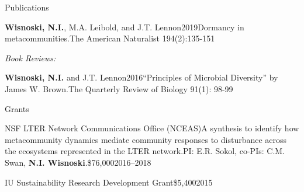 \documentclass{resume} %
\begin{document}
\begin{rhangSection}{Publications}
\begin{Publication}{{\bf Wisnoski, N.I.}, M.A. Leibold, and J.T. Lennon}{2019}{Dormancy in metacommunities.}{The American Naturalist 194(2):135-151}
\end{Publication}

\bigskip

{\it Book Reviews:}
\begin{Publication}{{\bf Wisnoski, N.I.} and J.T. Lennon}{2016}{\enquote{Principles of Microbial Diversity} by James W. Brown.}{The Quarterly Review of Biology 91(1): 98-99}
\end{Publication}

\end{rhangSection}

\bigskip

\newpage
\begin{rSection}{Grants}

\begin{Grant}{NSF LTER Network Communications Office (NCEAS)}{A synthesis to identify how metacommunity dynamics mediate community responses to disturbance across the ecosystems represented in the LTER network.}{PI: E.R. Sokol, co-PIs: C.M. Swan, {\bf N.I. Wisnoski}.}{\$76,000}{2016--2018}
\end{Grant}


\begin{Grant}{IU Sustainability Research Development Grant}{}{}{\$5,400}{2015}
\end{Grant}

\end{rSection}

\bigskip
\end{document}
